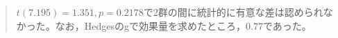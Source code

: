\begin{quote}
	$t(7.195)=1.351,p = 0.2178$で2群の間に統計的に有意な差は認められなかった。なお，Hedgesのgで効果量を求めたところ，0.77であった。
\end{quote}
